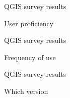 \begin{frame}{QGIS survey results}
	\begin{block}{User proficiency}
	\end{block}
\end{frame}

\begin{frame}{QGIS survey results}
	\begin{block}{Frequency of use}
	\end{block}
\end{frame}

\begin{frame}{QGIS survey results}
	\begin{block}{Which version}
	\end{block}
\end{frame}

